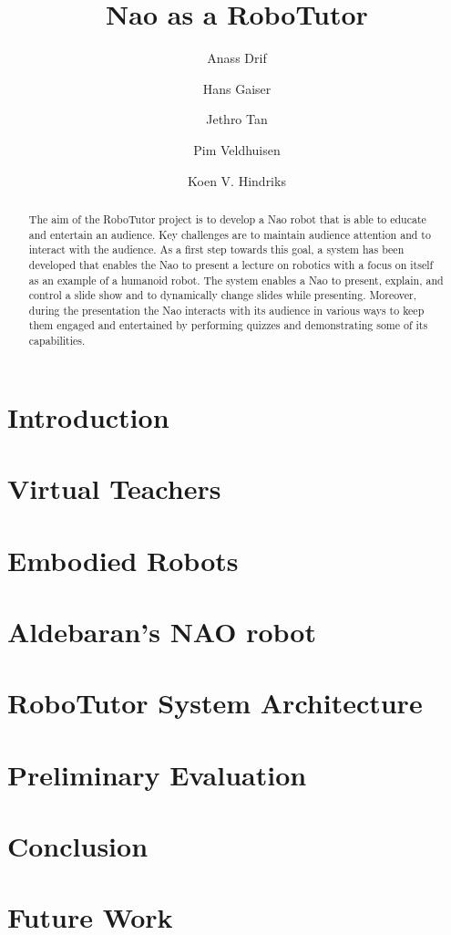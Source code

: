 \documentclass{llncs}
\title{Nao as a RoboTutor}
\author{Anass Drif \and Hans Gaiser \and Jethro Tan \and Pim Veldhuisen \and Koen V. Hindriks}
\institute{Delft University of Technology}
\begin{document}
\maketitle

\begin{abstract}
The aim of the RoboTutor project is to develop a Nao robot that is able to educate and entertain an audience. Key challenges are to maintain audience attention and to interact with the audience. As a first step towards this goal, a system has been developed that enables the Nao to present a lecture on robotics with a focus on itself as an example of a humanoid robot. The system enables a Nao to present, explain, and control a slide show and to dynamically change slides while presenting. Moreover, during the presentation the Nao interacts with its audience in various ways to keep them engaged and entertained by performing quizzes and demonstrating some of its capabilities.
\end{abstract}

%
%
\section{Introduction}


%
%
\section{Virtual Teachers}\label{sec:virtual}


%
%
\section{Embodied Robots}\label{sec:embodied}


%
%
\section{Aldebaran's NAO robot}\label{sec:NAO}



%
%
\section{RoboTutor System Architecture}\label{sec:architecture}


%
%
\section{Preliminary Evaluation}\label{sec:evaluation}


%
%
\section{Conclusion}\label{sec:conclusion}


%
%
\section{Future Work}\label{sec:future}


%
%


\end{document}
